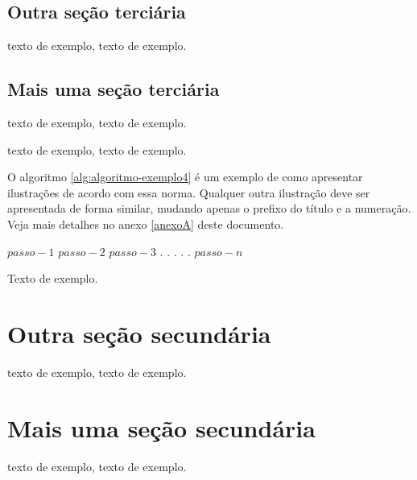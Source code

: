 \documentclass[
	12pt,				%
	oneside,			%
	a4paper,			%
	english,			%
	brazil				%
	]{abntex2ppgsi}
\begin{document}
\subsection{Outra seção terciária}

 texto de exemplo, texto de exemplo.

\subsection{Mais uma seção terciária}

 texto de exemplo, texto de exemplo.

 texto de exemplo, texto de exemplo.

O algoritmo \ref{alg:algoritmo-exemplo4} é um exemplo de como apresentar ilustrações de acordo com essa norma. Qualquer outra ilustração deve ser apresentada de forma similar, mudando apenas o prefixo do título e a numeração. Veja mais detalhes no anexo \ref{anexoA} deste documento.

\begin{algorithm}[htbp]
\caption{Exemplo de título bem grande de ilustração do tipo algoritmo, bem grande bem grande bem grande bem grande bem grande bem grande bem grande bem grande bem grande bem grande bem grande bem grande bem grande bem grande bem grande bem grande bem grande bem grande bem grande bem grande bem grande bem grande bem grande bem grande bem grande bem grande bem grande bem grande bem grande bem grande}
\label{alg:algoritmo-exemplo4}
\begin{algorithmic}[1]
\State $passo-1$
\State $passo-2$
\State $passo-3$
\State $.$
\State $.$
\State $.$
\State $.$
\State $.$
\State $passo-n$
\EndProcedure
\end{algorithmic}
\end{algorithm}


Texto de exemplo.

\section{Outra seção secundária}

 texto de exemplo, texto de exemplo.


\section{Mais uma seção secundária}

 texto de exemplo, texto de exemplo.
\end{document}
